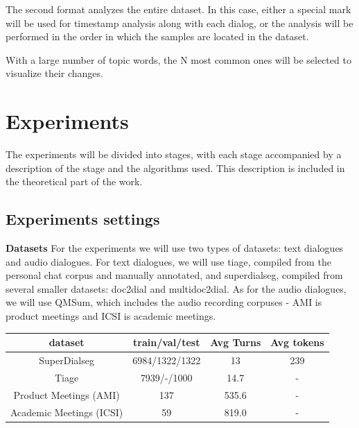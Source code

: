 \documentclass[PMI,VKR]{HSEUniversity}
\begin{document}
The second format analyzes the entire dataset. 
In this case, either a special mark will be used for timestamp analysis along with each dialog, or the analysis will be performed in the order in which the samples are located in the dataset.

With a large number of topic words, the N most common ones will be selected to visualize their changes.

\chapter{Experiments}

The experiments will be divided into stages, with each stage accompanied by a description of the stage and the algorithms used. 
This description is included in the theoretical part of the work.

\section{Experiments settings}

\textbf{Datasets}
For the experiments we will use two types of datasets: text dialogues and audio dialogues. 
For text dialogues, we will use tiage, compiled from the personal chat corpus and manually annotated, and superdialseg, compiled from several smaller datasets: doc2dial and multidoc2dial. 
As for the audio dialogues, we will use QMSum, which includes the audio recording corpuses - AMI is product meetings and ICSI is academic meetings. \\

\begin{table}[htb]
    \begin{center}
        \begin{tabular}{ | c | c | c | c |} 
            \hline
            dataset & train/val/test & Avg Turns & Avg tokens \\ 
            \hline
            SuperDialseg & 6984/1322/1322 & 13 & 239 \\ 
            Tiage &  7939/-/1000 & 14.7  & - \\ 
            \hline
            Product Meetings (AMI) & 137 & 535.6 & - \\ 
            Academic Meetings (ICSI) & 59 & 819.0 & - \\ 
            \hline
        \end{tabular}
    \end{center}
\end{table}
\end{document}
